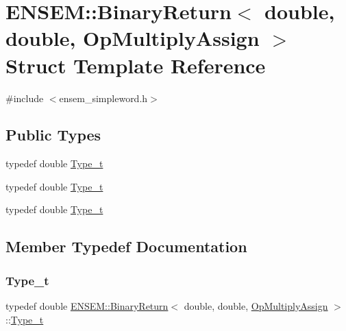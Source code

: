 \hypertarget{structENSEM_1_1BinaryReturn_3_01double_00_01double_00_01OpMultiplyAssign_01_4}{}\section{E\+N\+S\+EM\+:\+:Binary\+Return$<$ double, double, Op\+Multiply\+Assign $>$ Struct Template Reference}
\label{structENSEM_1_1BinaryReturn_3_01double_00_01double_00_01OpMultiplyAssign_01_4}


{\ttfamily \#include $<$ensem\+\_\+simpleword.\+h$>$}

\subsection*{Public Types}
\begin{DoxyCompactItemize}
\item 
typedef double \mbox{\hyperlink{structENSEM_1_1BinaryReturn_3_01double_00_01double_00_01OpMultiplyAssign_01_4_a68d7326bd6a61910b02ec674e3a92f01}{Type\+\_\+t}}
\item 
typedef double \mbox{\hyperlink{structENSEM_1_1BinaryReturn_3_01double_00_01double_00_01OpMultiplyAssign_01_4_a68d7326bd6a61910b02ec674e3a92f01}{Type\+\_\+t}}
\item 
typedef double \mbox{\hyperlink{structENSEM_1_1BinaryReturn_3_01double_00_01double_00_01OpMultiplyAssign_01_4_a68d7326bd6a61910b02ec674e3a92f01}{Type\+\_\+t}}
\end{DoxyCompactItemize}


\subsection{Member Typedef Documentation}
\mbox{\label{structENSEM_1_1BinaryReturn_3_01double_00_01double_00_01OpMultiplyAssign_01_4_a68d7326bd6a61910b02ec674e3a92f01}} 
\subsubsection{\texorpdfstring{Type\_t}{Type\_t}\hspace{0.1cm}{\footnotesize\ttfamily [1/3]}}
{\footnotesize\ttfamily typedef double \mbox{\hyperlink{structENSEM_1_1BinaryReturn}{E\+N\+S\+E\+M\+::\+Binary\+Return}}$<$ double, double, \mbox{\hyperlink{structENSEM_1_1OpMultiplyAssign}{Op\+Multiply\+Assign}} $>$\+::\mbox{\hyperlink{structENSEM_1_1BinaryReturn_3_01double_00_01double_00_01OpMultiplyAssign_01_4_a68d7326bd6a61910b02ec674e3a92f01}{Type\+\_\+t}}}

